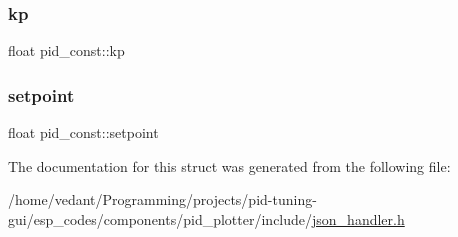 \subsubsection{\texorpdfstring{kp}{kp}}
{\footnotesize\ttfamily float pid\+\_\+const\+::kp}

\mbox{\label{structpid__const_a19b1118c03f705f3b693216e8f22d98a}} 
\subsubsection{\texorpdfstring{setpoint}{setpoint}}
{\footnotesize\ttfamily float pid\+\_\+const\+::setpoint}



The documentation for this struct was generated from the following file\+:\begin{DoxyCompactItemize}
\item 
/home/vedant/\+Programming/projects/pid-\/tuning-\/gui/esp\+\_\+codes/components/pid\+\_\+plotter/include/\hyperlink{json__handler_8h}{json\+\_\+handler.\+h}\end{DoxyCompactItemize}
